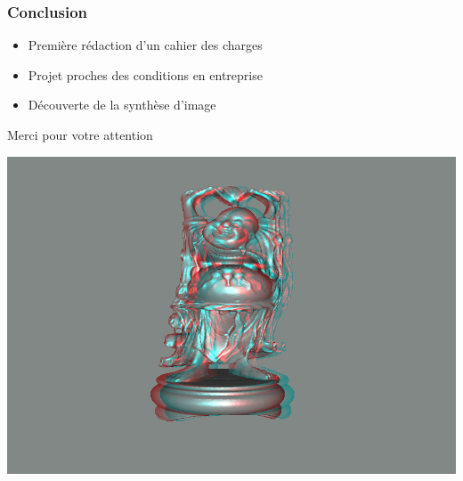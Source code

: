 \documentclass{beamer}
\begin{document}

\begin{frame}
\frametitle{Conclusion}
\begin{itemize}[label=$\bullet$]
\item Première rédaction d'un cahier des charges
\item Projet proches des conditions en entreprise
\item Découverte de la synthèse d'image
\end{itemize}
\end{frame}

%
	
\begin{frame}
\Huge{\centerline{Merci pour votre attention}}
\centering
\includegraphics[scale=0.35]{happy_dubois.png}
\end{frame}

\end{document}
